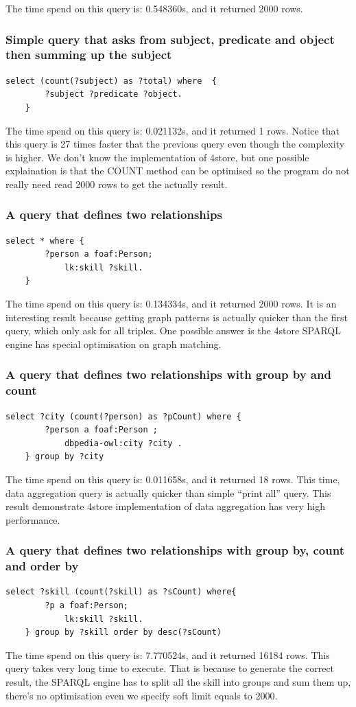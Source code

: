 The time spend on this query is: 0.548360s, and it returned 2000 rows.

\subsubsection{Simple query that asks from subject, predicate and object then summing up the subject}
\begin{Verbatim}[frame=single]
	select (count(?subject) as ?total) where  {
		?subject ?predicate ?object. 
	}
\end{Verbatim}
The time spend on this query is: 0.021132s, and it returned 1 rows.
Notice that this query is 27 times faster that the previous query even though the complexity is higher. We don't know the implementation of 4store, but one possible explaination is that the COUNT method can be optimised so the program do not really need read 2000 rows to get the actually result.

\subsubsection{A query that defines two relationships}
\begin{Verbatim}[frame=single]
	select * where {
		?person a foaf:Person;
			lk:skill ?skill.
	}
\end{Verbatim}
The time spend on this query is: 0.134334s, and it returned 2000 rows.
It is an interesting result because getting graph patterns is actually quicker than the first query, which only ask for all triples. One possible answer is the 4store SPARQL engine has special optimisation on graph matching.

\subsubsection{A query that defines two relationships with group by and count}
\begin{Verbatim}[frame=single]
	select ?city (count(?person) as ?pCount) where {
		?person a foaf:Person ;
			dbpedia-owl:city ?city .
	} group by ?city
\end{Verbatim}
The time spend on this query is: 0.011658s, and it returned 18 rows.
This time, data aggregation query is actually quicker than simple ``print all'' query. This result demonstrate 4store implementation of data aggregation has very high performance.

\subsubsection{A query that defines two relationships with group by, count and order by}
\begin{Verbatim}[frame=single]
	select ?skill (count(?skill) as ?sCount) where{
		?p a foaf:Person;
			lk:skill ?skill.
	} group by ?skill order by desc(?sCount)
\end{Verbatim}
The time spend on this query is: 7.770524s, and it returned 16184 rows.
This query takes very long time to execute. That is because to generate the correct result, the SPARQL engine has to split all the skill into groups and sum them up, there's no optimisation even we specify soft limit equals to 2000.

